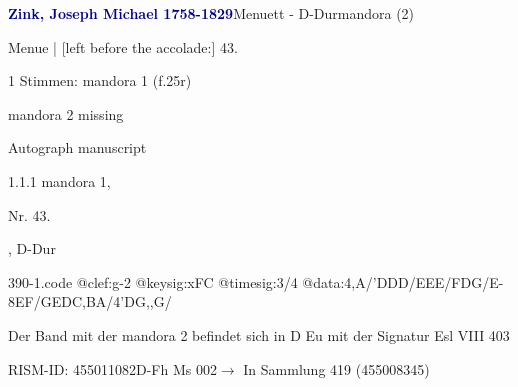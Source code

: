 \documentclass[twocolumn, 12pt]{book}
\begin{document}
\par \vspace{16pt} \textcolor{darkblue}{\textbf{Zink, Joseph Michael  1758-1829}}\hfillplus{\textbf{[390]}}\newline Menuett - D-Dur\newline mandora (2)
\par \begin{itshape}[f.25r, at left:] Menue | [left before the accolade:] 43.\end{itshape} 
\par \textcolor{darkblue}{}  1 Stimmen: mandora 1  (f.25r)\newline \begin{small} mandora 2 missing\end{small} \newline Autograph manuscript
\par 1.1.1  mandora 1, \begin{itshape}Nr. 43.\end{itshape}, D-Dur  
\begin{filecontents*}{390-1.code}
@clef:g-2
@keysig:xFC
@timesig:3/4
@data:4,A/'DDD/EEE/FDG/E-{8EF}/{GE}{DC}{,BA}/4'DG,,G/
\end{filecontents*}
\newline %
\par Der Band mit der mandora 2 befindet sich in D Eu mit der Signatur Esl VIII 403
\par RISM-ID: 455011082\newline D-Fh  Ms 002\newline $\rightarrow$ In Sammlung 419 (455008345)
      
\end{document}

